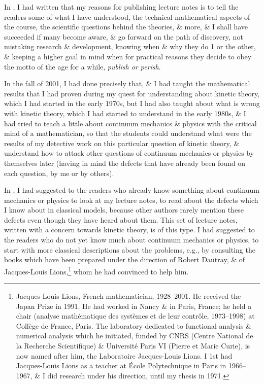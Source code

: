 \documentclass{article}
\begin{document}
\begin{enumerate}
	In \cite{Tartar2007}, I had written that my reasons for publishing lecture notes is to tell the readers some of what I have understood, the technical mathematical aspects of the course, the scientific questions behind the theories, \& more, \& I shall have succeeded if many become aware, \& go forward on the path of discovery, not mistaking research \& development, knowing when \& why they do 1 or the other, \& keeping a higher goal in mind when for practical reasons they decide to obey the motto of the age for a while, {\it publish or perish}.
	
	In the fall of 2001, I had done precisely that, \& I had taught the mathematical results that I had proven during my quest for understanding about kinetic theory, which I had started in the early 1970s, but I had also taught about what is wrong with kinetic theory, which I had started to understand in the early 1980s, \& I had tried to teach a little about continuum mechanics \& physics with the critical mind of a mathematician, so that the students could understand what were the results of my detective work on this particular question of kinetic theory, \& understand how to attack other questions of continuum mechanics or physics by themselves later (having in mind the defects that have already been found on each question, by me or by others).
	
	In \cite{Tartar2007}, I had suggested to the readers who already know something about continuum mechanics or physics to look at my lecture notes, to read about the defects which I know about in classical models, because other authors rarely mention these defects even though they have heard about them. This set of lecture notes, written with a concern towards kinetic theory, is of this type. I had suggested to the readers who do not yet know much about continuum mechanics or physics, to start with more classical descriptions about the problems, e.g., by consulting the books which have been prepared under the direction of {\sc Robert Dautray}, \& of {\sc Jacques-Louis Lions},\footnote{{\sc Jacques-Louis Lions}, French mathematician, 1928--2001. He received the Japan Prize in 1991. He had worked in Nancy \& in Paris, France; he held a chair (analyse mathématique des systèmes et de leur contrôle, 1973--1998) at Coll\`ege de France, Paris. The laboratory dedicated to functional analysis \& numerical analysis which he initiated, funded by CNRS (Centre National de la Recherche Scientifique) \& Université Paris VI (Pierre et Marie Curie), is now named after him, the Laboratoire Jacques-Louis Lions. I 1st had {\sc Jacques-Louis Lions} as a teacher at \'Ecole Polytechnique in Paris in 1966--1967, \& I did research under his direction, until my thesis in 1971.} whom he had convinced to help him.
	

\end{enumerate}
\end{document}
